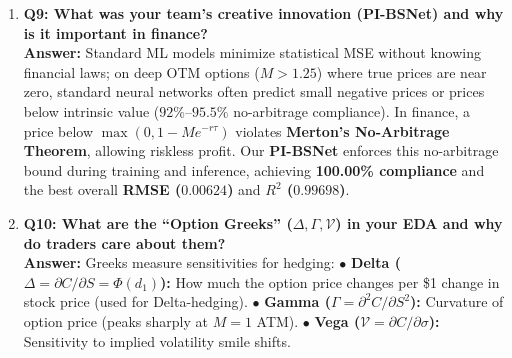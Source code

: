 \documentclass[10pt]{article}
\begin{document}
\begin{enumerate}
    \item \textbf{\color{crimson}Q9: What was your team's creative innovation (PI-BSNet) and why is it important in finance?}\\
    \textbf{Answer:} Standard ML models minimize statistical MSE without knowing financial laws; on deep OTM options ($M > 1.25$) where true prices are near zero, standard neural networks often predict small negative prices or prices below intrinsic value ($92\%$--$95.5\%$ no-arbitrage compliance). In finance, a price below $\max(0, 1 - Me^{-r\tau})$ violates \textbf{Merton's No-Arbitrage Theorem}, allowing riskless profit. Our \textbf{PI-BSNet} enforces this no-arbitrage bound during training and inference, achieving \textbf{100.00\% compliance} and the best overall \textbf{RMSE ($0.00624$)} and \textbf{$R^2$ ($0.99698$)}.

    \item \textbf{\color{crimson}Q10: What are the ``Option Greeks'' ($\Delta, \Gamma, \mathcal{V}$) in your EDA and why do traders care about them?}\\
    \textbf{Answer:} Greeks measure sensitivities for hedging:
    $\bullet$ \textbf{Delta ($\Delta = \partial C / \partial S = \Phi(d_1)$):} How much the option price changes per \$1 change in stock price (used for Delta-hedging).
    $\bullet$ \textbf{Gamma ($\Gamma = \partial^2 C / \partial S^2$):} Curvature of option price (peaks sharply at $M=1$ ATM).
    $\bullet$ \textbf{Vega ($\mathcal{V} = \partial C / \partial \sigma$):} Sensitivity to implied volatility smile shifts.
\end{enumerate}
\end{document}
